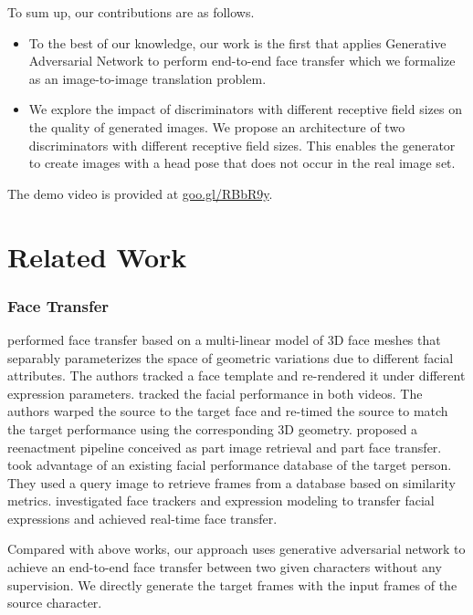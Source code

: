 \documentclass[letterpaper]{article} %
\begin{document}
	
	To sum up, our contributions are as follows.
	\begin{itemize}
		\item To the best of our knowledge, our work is the first that applies Generative Adversarial Network to perform end-to-end face transfer which we formalize as an image-to-image translation problem.
		\item We explore the impact of discriminators with different receptive field sizes on the quality of generated images. We propose an architecture of two discriminators with different receptive field sizes. This enables the generator to create images with a head pose that does not occur in the real image set.%
	\end{itemize}
	
	The demo video is provided at \url{goo.gl/RBbR9y}.
	
	\section{Related Work}
	\subsubsection{Face Transfer}
	\cite{vlasic2005face} performed face transfer based on a multi-linear model of 3D face meshes that separably parameterizes the space of geometric variations due to different facial attributes. The authors tracked a face template and re-rendered it under different expression parameters. \cite{dale2011video} tracked the facial performance in both videos. The authors warped the source to the target face and re-timed the source to match the target performance using the corresponding 3D geometry. \cite{garrido2014automatic} proposed a reenactment pipeline conceived as part image retrieval and part face transfer. \cite{li2012data} took advantage of an existing facial performance database of the target person. They used a query image to retrieve frames from a database based on similarity metrics. \cite{thies2016face2face} investigated face trackers and expression modeling to transfer facial expressions and achieved real-time face transfer. 
	
	Compared with above works, our approach uses generative adversarial network to achieve an end-to-end face transfer between two given characters without any supervision. We directly generate the target frames with the input frames of the source character.
	
\end{document}
